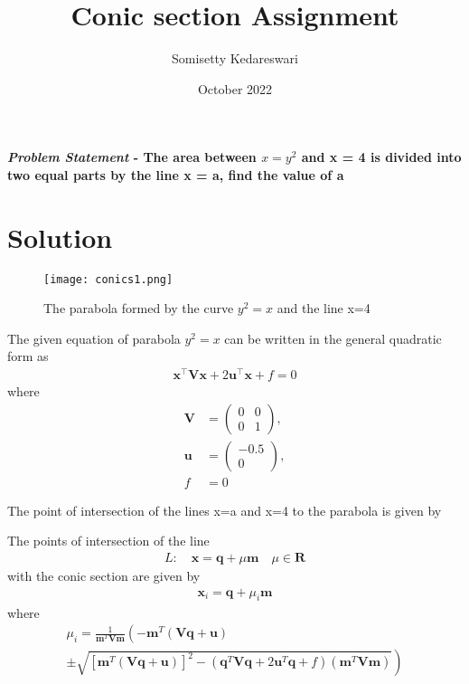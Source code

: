 \documentclass[journal,10pt,twocolumn]{article}
\title{\textbf{Conic section Assignment}}
\author{Somisetty Kedareswari}
\date{October 2022}
\let\vec\mathbf
\newcommand{\myvec}[1]{\ensuremath{\begin{pmatrix}#1\end{pmatrix}}}
\providecommand{\brak}[1]{\ensuremath{\left(#1\right)}}
\providecommand{\lbrak}[1]{\ensuremath{\left(#1\right.}}
\providecommand{\rbrak}[1]{\ensuremath{\left.#1\right)}}
\providecommand{\sbrak}[1]{\ensuremath{{}\left[#1\right]}}
\begin{document}
\maketitle
\paragraph{\textit{Problem Statement} - The area between $x = y^2$ and x = 4 is divided into two equal parts by the line x = a, find the value of a}
\section*{\large Solution}

\begin{figure}[h]
\centering
\texttt{[image: conics1.png]}

\caption{The parabola formed by the curve $y^2 = x$ and the line x=4}
\label{fig:parabola}
\end{figure}

The given equation of parabola $y^2 = x$ can be written in the general quadratic form as
\begin{align}
    \label{eq:conic_quad_form}
    \vec{x}^{\top}\vec{V}\vec{x}+2\vec{u}^{\top}\vec{x}+f=0
    \end{align}
where
\begin{align}
 \label{eq:V_matrix}
 \vec{V} &= \myvec{0 & 0\\0 & 1},
 \\
 \label{eq:u_vector}
 \vec{u} &= \myvec{-0.5\\ 0},
 \\
 \label{eq:f_value}
 f &= 0
\end{align}



The point of intersection of the lines x=a and x=4 to the parabola is given by



The points of intersection of the line 
\begin{align}
 L: \quad \vec{x} = \vec{q} + \mu \vec{m} \quad \mu \in \mathbf{R}
\label{eq:conic_tangent}
\end{align}
with the conic section are given by
\begin{align}
\vec{x}_i = \vec{q} + \mu_i \vec{m}
\label{eq:conic_tangent_pts}
\end{align}
%
where
{\tiny
\begin{multline}
\mu_i = \frac{1}
{
\vec{m}^T\vec{V}\vec{m}
}
\lbrak{-\vec{m}^T\brak{\vec{V}\vec{q}+\vec{u}}}
\\
\pm
\rbrak{\sqrt{
\sbrak{
\vec{m}^T\brak{\vec{V}\vec{q}+\vec{u}}
}^2
-
\brak
{
\vec{q}^T\vec{V}\vec{q} + 2\vec{u}^T\vec{q} +f
}
\brak{\vec{m}^T\vec{V}\vec{m}}
}
}
\label{eq:tangent_roots}
\end{multline}
}
\end{document}
